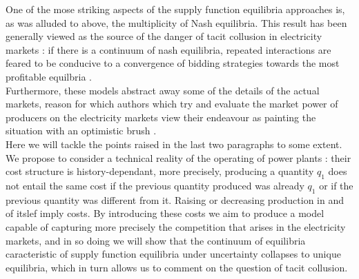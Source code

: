 One of the mose striking aspects of the supply function equilibria approaches is, as was alluded to above, the multiplicity of Nash equilibria. This result has been generally viewed as the source of the danger of tacit collusion in electricity markets : if there is a continuum of nash equilibria, repeated interactions are feared to be conducive to a convergence of bidding strategies towards the most profitable equilbria \cite{bolle1992supply}. \\

Furthermore, these models abstract away some of the details of the actual markets, reason for which authors which try and evaluate the market power of producers on the electricity markets view their endeavour as painting the situation with an optimistic brush \cite{Newgreen}. \\

Here we will tackle the points raised in the last two paragraphs to some extent. We propose to consider a technical reality of the operating of power plants : their cost structure is history-dependant, more precisely, producing a quantity $q_1$ does not entail the same cost if the previous quantity produced was already $q_1$ or if the previous quantity was different from it. Raising or decreasing production in and of itslef imply costs. By introducing these costs we aim to produce a model capable of capturing more precisely the competition that arises in the electricity markets, and in so doing we will show that the continuum of equilibria caracteristic of supply function equilibria under uncertainty collapses to unique equilibria, which in turn allows us to comment on the question of tacit collusion.\\


